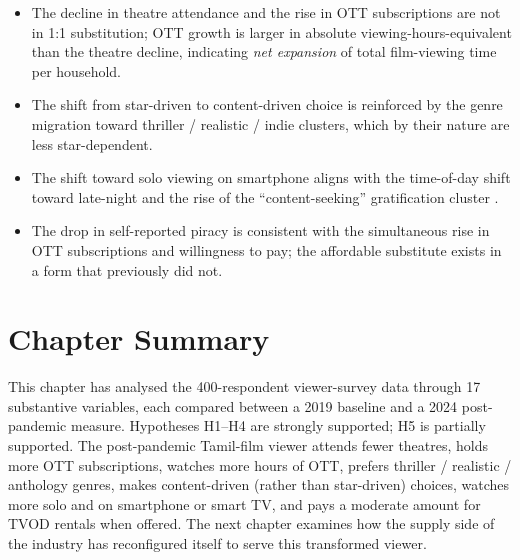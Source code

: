 \begin{itemize}[itemsep=2pt]
\item The decline in theatre attendance and the rise in OTT
      subscriptions are not in 1:1 substitution; OTT growth is
      larger in absolute viewing-hours-equivalent than the theatre
      decline, indicating \emph{net expansion} of total film-viewing
      time per household.
\item The shift from star-driven to content-driven choice is
      reinforced by the genre migration toward thriller / realistic /
      indie clusters, which by their nature are less star-dependent.
\item The shift toward solo viewing on smartphone aligns with the
      time-of-day shift toward late-night and the rise of the
      ``content-seeking'' gratification cluster
      \citep{sundet2021,lotz2022}.
\item The drop in self-reported piracy is consistent with the
      simultaneous rise in OTT subscriptions and willingness to
      pay; the affordable substitute exists in a form that
      previously did not.
\end{itemize}

\section{Chapter Summary}
\label{sec:viewer_summary}

This chapter has analysed the 400-respondent viewer-survey data
through 17 substantive variables, each compared between a 2019
baseline and a 2024 post-pandemic measure.  Hypotheses H1--H4 are
strongly supported; H5 is partially supported.  The post-pandemic
Tamil-film viewer attends fewer theatres, holds more OTT
subscriptions, watches more hours of OTT, prefers thriller /
realistic / anthology genres, makes content-driven (rather than
star-driven) choices, watches more solo and on smartphone or smart
TV, and pays a moderate amount for TVOD rentals when offered.  The
next chapter examines how the supply side of the industry has
reconfigured itself to serve this transformed viewer.
